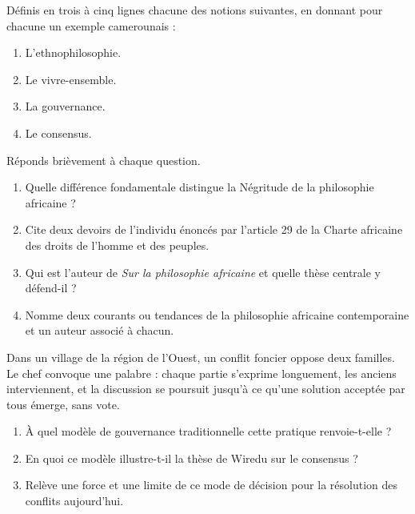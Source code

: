 \documentclass[11pt]{article}
\newcommand{\cle}[1]{{\popxbold\color{popdark}#1}}
\newcounter{popsec}
\newcounter{popsub}
\newcommand{\courssub}[1]{%
  \stepcounter{popsub}%
  \par\vspace{9pt}\noindent{\popxbold\fontsize{11.5}{13}\selectfont\color{popink}{\color{poporange}\thepopsec.\thepopsub}\hspace{6pt}#1}\par\nopagebreak\vspace{4pt}
}
\begin{document}
\begin{exercice}[Définitions]
Définis en trois à cinq lignes chacune des notions suivantes, en donnant pour chacune un exemple camerounais :
\begin{enumerate}
\item L'\cle{ethnophilosophie}.
\item Le \cle{vivre-ensemble}.
\item La \cle{gouvernance}.
\item Le \cle{consensus}.
\end{enumerate}
\end{exercice}

\begin{exercice}
Réponds brièvement à chaque question.
\begin{enumerate}
\item Quelle différence fondamentale distingue la Négritude de la philosophie africaine ?
\item Cite deux devoirs de l'individu énoncés par l'article 29 de la Charte africaine des droits de l'homme et des peuples.
\item Qui est l'auteur de \emph{Sur la philosophie africaine} et quelle thèse centrale y défend-il ?
\item Nomme deux courants ou tendances de la philosophie africaine contemporaine et un auteur associé à chacun.
\end{enumerate}
\end{exercice}

\courssub{Je m'entraîne}

\begin{exercice}
Dans un village de la région de l'Ouest, un conflit foncier oppose deux familles. Le chef convoque une palabre : chaque partie s'exprime longuement, les anciens interviennent, et la discussion se poursuit jusqu'à ce qu'une solution acceptée par tous émerge, sans vote.
\begin{enumerate}
\item À quel modèle de gouvernance traditionnelle cette pratique renvoie-t-elle ?
\item En quoi ce modèle illustre-t-il la thèse de Wiredu sur le consensus ?
\item Relève une force et une limite de ce mode de décision pour la résolution des conflits aujourd'hui.
\end{enumerate}
\end{exercice}
\end{document}
